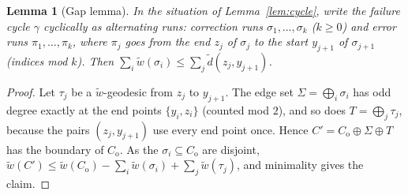 \documentclass[11pt]{article}
\theoremstyle{plain}
\newtheorem{lemma}{Lemma}
\theoremstyle{definition}
\theoremstyle{remark}
\newcommand{\Co}{C_{\mathrm{o}}}
\newcommand{\tw}{\tilde w}
\newcommand{\td}{\tilde d}
\renewcommand{\_}{\oldunderscore\allowbreak}
\begin{document}
\begin{lemma}[Gap lemma]\label{lem:gap}
In the situation of Lemma~\ref{lem:cycle}, write the failure cycle $\gamma$ cyclically as alternating runs: correction runs $\sigma_1,\dots,\sigma_k$ ($k\ge0$) and error runs $\pi_1,\dots,\pi_k$, where $\pi_j$ goes from the end $z_j$ of $\sigma_j$ to the start $y_{j+1}$ of $\sigma_{j+1}$ (indices mod $k$). Then $\sum_i\tw(\sigma_i)\le\sum_j\td(z_j,y_{j+1})$.
\end{lemma}
\begin{proof}
Let $\tau_j$ be a $\tw$-geodesic from $z_j$ to $y_{j+1}$. The edge set $\Sigma=\bigoplus_i\sigma_i$ has odd degree exactly at the end points $\{y_i,z_i\}$ (counted mod $2$), and so does $T=\bigoplus_j\tau_j$, because the pairs $(z_j,y_{j+1})$ use every end point once. Hence $C'=\Co\oplus\Sigma\oplus T$ has the boundary of $\Co$. As the $\sigma_i\subseteq\Co$ are disjoint, $\tw(C')\le\tw(\Co)-\sum_i\tw(\sigma_i)+\sum_j\tw(\tau_j)$, and minimality gives the claim.
\end{proof}
\end{document}

